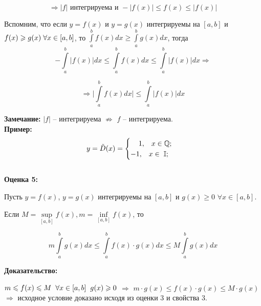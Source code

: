 \documentclass[a4paper,12pt]{article} %
\renewcommand {\geq}{\geqslant}
\renewcommand {\leq}{\leqslant}
\begin{document}
	$$\Rightarrow |f| \text{ интегрируема и } - |f(x)| \leq f (x) \leq |f (x)| $$
	
	Вспомним, что если $ y = f(x) $ и $ y = g(x) $ интегрируемы на $ [a,b] $ и $ f(x) \geq g(x) \hspace{1 mm} \forall x \in [a, b]$, то $ \int\limits_a^b f(x)dx \geq \int\limits_a^b g(x)dx $, тогда \\ [1 mm]
	$$ - \int\limits_a^b |f(x)| dx \leq \int\limits_a^b f(x) dx \leq \int\limits_a^b |f(x)| dx \Rightarrow $$
	
	$$\Rightarrow \bigg|\int\limits_a^b f(x)dx\bigg| \leq \int\limits_a^b |f(x)|dx $$
	
	\textbf{Замечание:}
	$ |f| $ -- интегрируема $\not\Rightarrow$ $ f $  -- интегрируема.\\
	
	\textbf{Пример:} \\
	\begin{equation*}
		y = \tilde D(x) = \begin{cases}
			\hspace{4 mm}1, \hspace{3 mm} x \in \mathbb{Q};\\
			-1,  \hspace{3 mm} x \in \hspace{1 mm} \mathbb{I};
		\end{cases}
	\end{equation*} \\ [2 mm]
	
	\textbf{Оценка 5:}
	
	Пусть $ y = f(x) $, $ y = g(x) $ интегрируемы на $ [a, b] $ и $ g(x) \geq 0 $ $\forall x \in [a, b] $.
	
	Если $ M = \sup\limits_{[a, b]} f (x), m = \inf\limits_{[a, b]} f(x) $, то
	
	$$ m\int\limits_a^b g(x)dx \leq \int\limits_a^b f(x) \cdot g(x)dx \leq M \int\limits_a^b g(x)dx $$
	
	\textbf{Доказательство:}
	
	$ m \leq f (x) \leq M \hspace{2 mm} \forall x \in [a, b]  \hspace{2 mm} g (x) \geq 0 $ $ \Rightarrow $
	$ m \cdot g(x) \leq f(x) \cdot g(x) \leq M \cdot g (x) $ \\ [2 mm] $ \Rightarrow $ исходное условие доказано исходя из оценки 3 и свойства 3.\\
	
\end{document}
